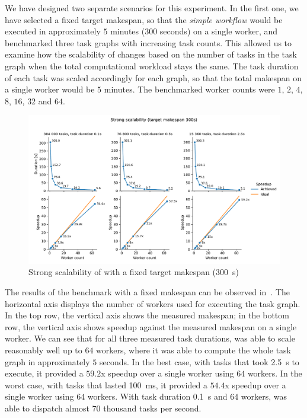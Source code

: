 We have designed two separate scenarios for this experiment. In the first one, we have selected a
fixed target makespan, so that the \emph{simple workflow} would be executed in approximately $5$
minutes ($300$ seconds) on a single worker, and benchmarked
three task graphs with increasing task counts. This allowed us to examine how the
scalability of \hyperqueue{} changes based on the number of tasks in the task graph when the total
computational workload stays the same. The task duration of each task was scaled accordingly for
each graph, so that the total makespan on a single worker would be $5$ minutes.
The benchmarked worker counts were $1$, $2$,
$4$, $8$, $16$, $32$
and $64$.

\begin{figure}[h]
	\centering
	\includegraphics[width=\textwidth]{imgs/hq/charts/scalability-fixed-makespan}
	\caption{Strong scalability of \hyperqueue{} with a fixed target makespan
	(\SI{300}{\second})}
	\label{fig:hq-scalability-fixed-makespan}
\end{figure}

The results of the benchmark with a fixed makespan can be observed in~. The
horizontal axis displays the number of workers used for executing the task graph. In the top row,
the vertical axis shows the measured makespan; in the bottom row, the vertical axis shows speedup
against the measured makespan on a single worker. We can see that for all three measured task
durations, \hyperqueue{} was able to scale reasonably well up to $64$
workers, where it was able to compute the whole task graph in approximately $5$
seconds. In the best case, with tasks that took \SI{2.5}{\second} to execute, it provided a
$59.2$x speedup over a single worker using $64$ workers. In the worst case, with
tasks that lasted \SI{100}{\milli\second}, it provided a $54.4$x speedup over a single worker using
$64$ workers. With task duration \SI{0.1}{\second} and
$64$ workers, \hyperqueue{} was able to dispatch almost
$70$ thousand tasks per second.

